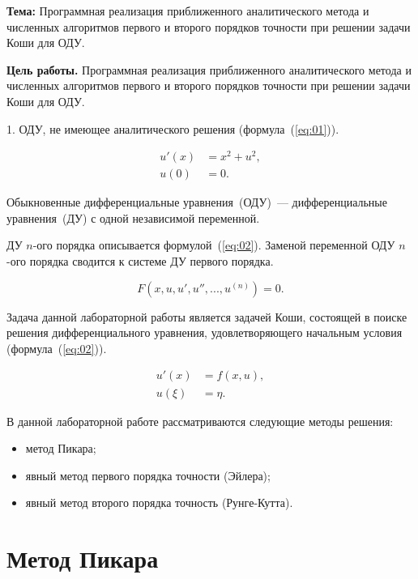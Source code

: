 \textbf{Тема:} Программная реализация приближенного аналитического метода и
численных алгоритмов первого и второго порядков точности при решении задачи Коши
для ОДУ.

\textbf{Цель работы.} Программная реализация приближенного аналитического метода
и численных алгоритмов первого и второго порядков точности при решении задачи
Коши для ОДУ.



1. ОДУ, не имеющее аналитического решения (формула~(\ref{eq:01})).

\begin{equation}\label{eq:01}
    \begin{aligned}
        u'(x) &= x^2 + u^2,\\
        u(0)~ &= 0.
    \end{aligned}
\end{equation}


Обыкновенные дифференциальные уравнения~(ОДУ)~--- дифференциальные
уравнения~(ДУ) с одной независимой переменной.

ДУ $n$-ого порядка описывается формулой~(\ref{eq:02}). Заменой
переменной ОДУ $n$-ого порядка сводится к системе ДУ первого порядка.

\begin{equation}\label{eq:02}
    F(x, u, u', u'', ..., u^{(n)}) = 0.
\end{equation}

Задача данной лабораторной работы является задачей Коши, состоящей в поиске решения
дифференциального уравнения, удовлетворяющего начальным условия (формула~(\ref{eq:02})).

\begin{equation}\label{eq:02}
    \begin{aligned}
        u'(x) &= f(x, u),\\
        u(\xi)~ &= \eta.
    \end{aligned}
\end{equation}

В данной лабораторной работе рассматриваются следующие методы решения:
\begin{itemize}
    \item метод Пикара;
    \item явный метод первого порядка точности (Эйлера);
    \item явный метод второго порядка точность (Рунге-Кутта).
\end{itemize}

\section{Метод Пикара}



